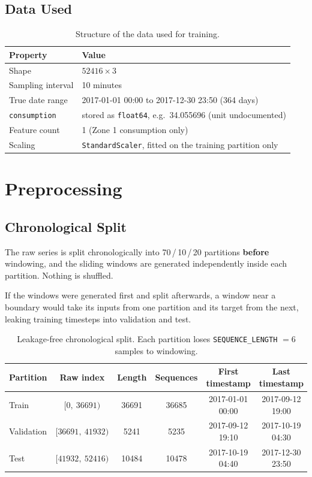 \documentclass[11pt,a4paper]{article}
\begin{document}
\subsection{Data Used}

\begin{table}[H]
\centering
\begin{tabular}{ll}
\toprule
\textbf{Property} & \textbf{Value} \\
\midrule
Shape & $52416 \times 3$ \\
Sampling interval & 10 minutes \\
True date range & 2017-01-01 00:00 to 2017-12-30 23:50 (364 days) \\
\texttt{consumption} & stored as \texttt{float64}, e.g.\ 34.055696 (unit undocumented) \\
Feature count & 1 (Zone 1 consumption only) \\
Scaling & \texttt{StandardScaler}, fitted on the training partition only \\
\bottomrule
\end{tabular}
\caption{Structure of the data used for training.}
\end{table}


\section{Preprocessing}

\subsection{Chronological Split}
\label{sec:split}

The raw series is split chronologically into 70\,/\,10\,/\,20 partitions \textbf{before} windowing,
and the sliding windows are generated independently inside each partition. Nothing is shuffled.

If the windows were generated first and split afterwards, a window near a boundary would take its
inputs from one partition and its target from the next, leaking training timesteps into validation
and test.

\begin{table}[H]
\centering
\small
\begin{tabular}{lccccc}
\toprule
\textbf{Partition} & \textbf{Raw index} & \textbf{Length} & \textbf{Sequences} & \textbf{First timestamp} & \textbf{Last timestamp} \\
\midrule
Train      & $[0,\ 36691)$     & 36691 & 36685 & 2017-01-01 00:00 & 2017-09-12 19:00 \\
Validation & $[36691,\ 41932)$ & 5241  & 5235  & 2017-09-12 19:10 & 2017-10-19 04:30 \\
Test       & $[41932,\ 52416)$ & 10484 & 10478 & 2017-10-19 04:40 & 2017-12-30 23:50 \\
\bottomrule
\end{tabular}
\caption{Leakage-free chronological split. Each partition loses
\texttt{SEQUENCE\_LENGTH} $=6$ samples to windowing.}
\end{table}
\end{document}
